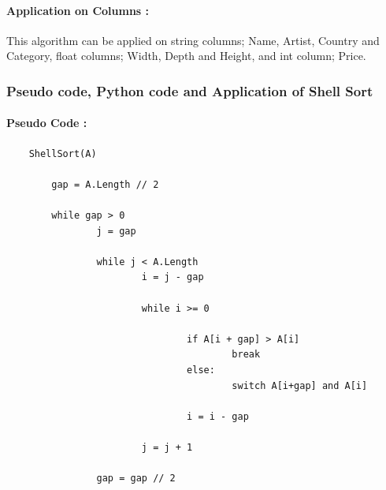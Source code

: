 \documentclass[12pt]{article}
\begin{document}
    \paragraph{Application on Columns :} 
    This algorithm can be applied on string columns; Name, Artist, Country and Category, float columns; Width, Depth and Height, and int column; Price.
    
    \newpage
    \subsubsection{Pseudo code, Python code and Application of Shell Sort}
    \paragraph{Pseudo Code :}
    \begin{verbatim}
    ShellSort(A)

        gap = A.Length // 2
     
        while gap > 0
                j = gap
                
                while j < A.Length
                        i = j - gap 
                        
                        while i >= 0
                                
                                if A[i + gap] > A[i]
                                        break
                                else:
                                        switch A[i+gap] and A[i]
                
                                i = i - gap 

                        j = j + 1
                        
                gap = gap // 2
    \end{verbatim}
\end{document}
